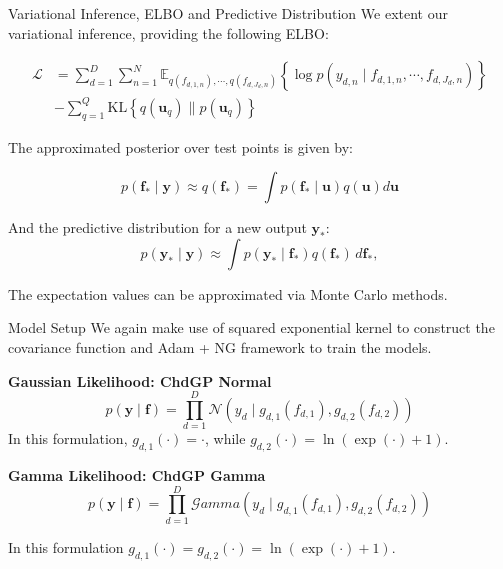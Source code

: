 \begin{frame}{Variational Inference, ELBO and Predictive Distribution}
	We extent our variational inference, providing the following ELBO:
	
\begin{equation*}
	\begin{split}
	\mathcal{L} &= \sum_{d=1}^D \sum_{n=1}^{N} \mathbb{E}_{q(f_{d,1,n}), \cdots, q(f_{d,J_d,n})} 
	\left\{ \log p\left( y_{d,n} \mid f_{d,1,n}, \cdots, f_{d,J_d,n} \right) \right\} \\
	&- \sum_{q=1}^Q \text{KL}\left\{ q(\mathbf{u}_q) \parallel p(\mathbf{u}_q) \right\}
	\end{split}
\end{equation*}

The approximated posterior over test points is given by:

\begin{equation*}
	p(\mathbf{f}_* \mid \mathbf{y}) \approx q(\mathbf{f}_*) = \int p(\mathbf{f}_* \mid \mathbf{u}) q(\mathbf{u}) d\mathbf{u}
\end{equation*}

And the predictive distribution for a new output $\mathbf{y}_*$:
\begin{equation*}
	p(\mathbf{y}_* \mid \mathbf{y}) \approx \int p(\mathbf{y}_* \mid \mathbf{f}_*) q(\mathbf{f}_*) \, d\mathbf{f}_*,
\end{equation*}

The expectation values can be approximated via Monte Carlo methods.
	
\end{frame}

\begin{frame}{Model Setup}
	We again make use of squared exponential kernel to construct the covariance function and Adam + NG framework to train the models.
		
	\begin{block}{\textbf{Gaussian Likelihood: ChdGP Normal}}
		\begin{equation*}
			p(\mathbf{y} \mid \mathbf{f}) = \prod_{d=1}^{D} \mathcal{N}\left(y_{d}\mid g_{d,1}(f_{d,1}), g_{d,2}(f_{d,2}) \right)
		\end{equation*}
		In this formulation, \(g_{d,1}(\cdot) = \cdot\), while \(g_{d,2}(\cdot) = \ln(\exp(\cdot) + 1)\).
	\end{block} 
	
	\begin{block}{\textbf{Gamma Likelihood: ChdGP Gamma}}
		\begin{equation*}
		p(\mathbf{y} \mid \mathbf{f}) = \prod_{d=1}^{D} \mathcal{G}amma\left( y_{d} \mid g_{d,1}(f_{d,1}), g_{d,2}(f_{d,2}) \right)
		\end{equation*}
		
		In this formulation \(g_{d,1}(\cdot) = g_{d,2}(\cdot) = \ln(\exp(\cdot) + 1)\).
	\end{block}
		
\end{frame}

